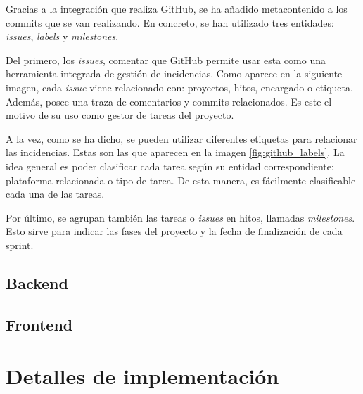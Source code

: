 Gracias a la integración que realiza GitHub, se ha añadido metacontenido a los commits que se van realizando. En concreto, se han utilizado tres entidades: \textit{issues}, \textit{labels} y \textit{milestones}.


Del primero, los \textit{issues}, comentar que GitHub permite usar esta como una herramienta integrada de gestión de incidencias. Como aparece en la siguiente imagen, cada \textit{issue} viene relacionado con: proyectos, hitos, encargado o etiqueta. Además, posee una traza de comentarios y commits relacionados. Es este el motivo de su uso como gestor de tareas del proyecto.


A la vez, como se ha dicho, se pueden utilizar diferentes etiquetas para relacionar las incidencias. Estas son las que aparecen en la imagen \ref{fig:github_labels}. La idea general es poder clasificar cada tarea según su entidad correspondiente: plataforma relacionada o tipo de tarea. De esta manera, es fácilmente clasificable cada una de las tareas.


Por último, se agrupan también las tareas o \textit{issues} en hitos, llamadas \textit{milestones}. Esto sirve para indicar las fases del proyecto y la fecha de finalización de cada sprint.


\subsection{Backend}

\subsection{Frontend}

\section{Detalles de implementación}\label{sec:detalles_implementacion}